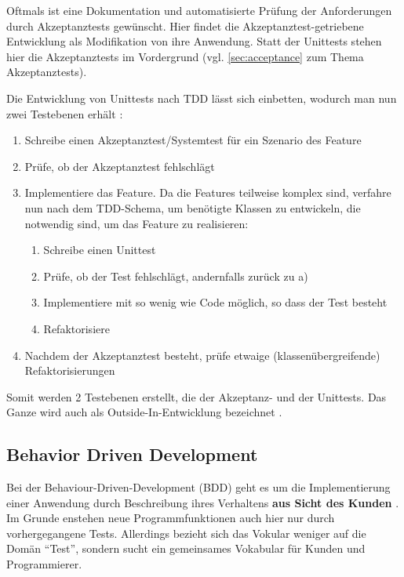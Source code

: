 Oftmals ist eine Dokumentation und automatisierte Prüfung der Anforderungen durch Akzeptanztests gewünscht. Hier findet die Akzeptanztest-getriebene Entwicklung als Modifikation von  ihre Anwendung. Statt der Unittests stehen hier die Akzeptanztests im Vordergrund (vgl. \ref{sec:acceptance} zum Thema Akzeptanztests).


Die Entwicklung von Unittests nach TDD lässt sich einbetten, wodurch man nun zwei Testebenen erhält \citep[S. 285]{chelimsky_rspec_2010}:

\begin{enumerate}
 \item Schreibe einen Akzeptanztest/Systemtest für ein Szenario des Feature
 \item Prüfe, ob der Akzeptanztest fehlschlägt

 \item Implementiere das Feature. Da die Features teilweise komplex sind, verfahre nun nach dem TDD-Schema, um benötigte Klassen zu entwickeln, die notwendig sind, um das Feature zu realisieren:
 \begin{enumerate}
   \item Schreibe einen Unittest
   \item Prüfe, ob der Test fehlschlägt, andernfalls zurück zu a)
   \item Implementiere mit so wenig wie Code möglich, so dass der Test besteht
   \item Refaktorisiere
 \end{enumerate}

 \item Nachdem der Akzeptanztest besteht, prüfe etwaige (klassenübergreifende) Refaktorisierungen

\end{enumerate}

Somit werden 2 Testebenen erstellt, die der Akzeptanz- und der Unittests. Das Ganze wird auch als Outside-In-Entwicklung bezeichnet \citep{chelimsky_rspec_2010}.

\subsection{Behavior Driven Development}
\label{sec:tddBdd}
Bei der Behaviour-Driven-Development (BDD) geht es um die Implementierung einer Anwendung durch Beschreibung ihres Verhaltens \textbf{aus Sicht des Kunden} \citep[S. 138]{chelimsky_rspec_2010}. Im Grunde enstehen neue Programmfunktionen auch hier nur durch vorhergegangene Tests. Allerdings bezieht sich das Vokular weniger auf die Domän "`Test"', sondern sucht ein gemeinsames Vokabular für Kunden und Programmierer.

